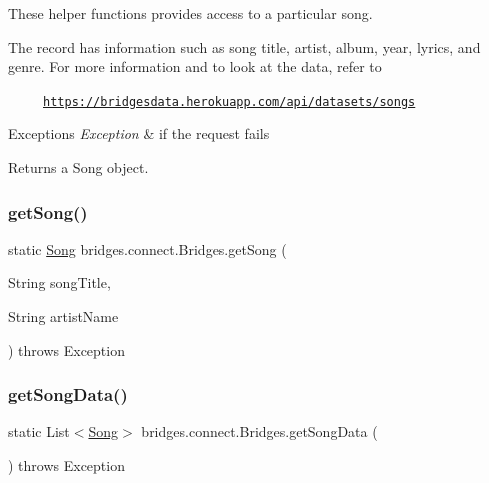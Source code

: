 These helper functions provides access to a particular song.

The record has information such as song title, artist, album, year, lyrics, and genre. For more information and to look at the data, refer to 

~~~~~\href{https://bridgesdata.herokuapp.com/api/datasets/songs}{\tt https\+://bridgesdata.\+herokuapp.\+com/api/datasets/songs} 


\begin{DoxyExceptions}{Exceptions}
{\em Exception} & if the request fails\\
\hline
\end{DoxyExceptions}
\begin{DoxyReturn}{Returns}
a Song object. 
\end{DoxyReturn}
\mbox{\label{classbridges_1_1connect_1_1_bridges_ae7621c3cfd9978aa02fe243317cf0cca}} 
\subsubsection{\texorpdfstring{get\+Song()}{getSong()}\hspace{0.1cm}{\footnotesize\ttfamily [2/2]}}
{\footnotesize\ttfamily static \mbox{\hyperlink{classbridges_1_1data__src__dependent_1_1_song}{Song}} bridges.\+connect.\+Bridges.\+get\+Song (\begin{DoxyParamCaption}\item[{String}]{song\+Title,  }\item[{String}]{artist\+Name }\end{DoxyParamCaption}) throws Exception\hspace{0.3cm}{\ttfamily [static]}}

\mbox{\label{classbridges_1_1connect_1_1_bridges_a5bcfed7f065d3c9da31e3551bf31ec7c}} 
\subsubsection{\texorpdfstring{get\+Song\+Data()}{getSongData()}}
{\footnotesize\ttfamily static List$<$\mbox{\hyperlink{classbridges_1_1data__src__dependent_1_1_song}{Song}}$>$ bridges.\+connect.\+Bridges.\+get\+Song\+Data (\begin{DoxyParamCaption}{ }\end{DoxyParamCaption}) throws Exception\hspace{0.3cm}{\ttfamily [static]}}

